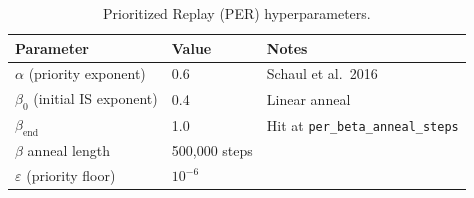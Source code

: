 \begin{table}[t]
\centering
\footnotesize
\caption{Prioritized Replay (PER) hyperparameters.}
\label{tab:hparams-per}
\begin{tabular}{l l l}
\toprule
Parameter & Value & Notes \\
\midrule
$\alpha$ (priority exponent) & 0.6 & Schaul et al.\ 2016 \\
$\beta_0$ (initial IS exponent) & 0.4 & Linear anneal \\
$\beta_{\text{end}}$ & 1.0 & Hit at \texttt{per\_beta\_anneal\_steps} \\
$\beta$ anneal length & 500{,}000 steps & \\
$\varepsilon$ (priority floor) & $10^{-6}$ & \\
\bottomrule
\end{tabular}
\end{table}


